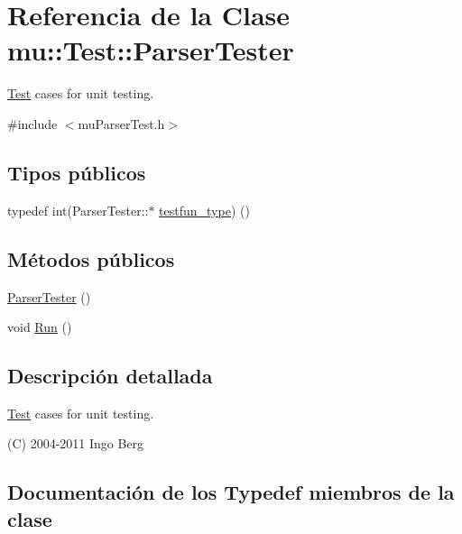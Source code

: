 \hypertarget{classmu_1_1_test_1_1_parser_tester}{}\section{Referencia de la Clase mu\+:\+:Test\+:\+:Parser\+Tester}
\label{classmu_1_1_test_1_1_parser_tester}


\hyperlink{namespacemu_1_1_test}{Test} cases for unit testing.  




{\ttfamily \#include $<$mu\+Parser\+Test.\+h$>$}

\subsection*{Tipos públicos}
\begin{DoxyCompactItemize}
\item 
typedef int(Parser\+Tester\+::$\ast$ \hyperlink{classmu_1_1_test_1_1_parser_tester_a57273757098109977ee5f151caef66a8}{testfun\+\_\+type}) ()
\end{DoxyCompactItemize}
\subsection*{Métodos públicos}
\begin{DoxyCompactItemize}
\item 
\hyperlink{classmu_1_1_test_1_1_parser_tester_a88a0af846d537fc5c35af7301ca9f322}{Parser\+Tester} ()
\item 
void \hyperlink{classmu_1_1_test_1_1_parser_tester_ab7ae6d2c1f0a42c1efb851017653d310}{Run} ()
\end{DoxyCompactItemize}


\subsection{Descripción detallada}
\hyperlink{namespacemu_1_1_test}{Test} cases for unit testing. 

(C) 2004-\/2011 Ingo Berg 

\subsection{Documentación de los \textquotesingle{}Typedef\textquotesingle{} miembros de la clase}
